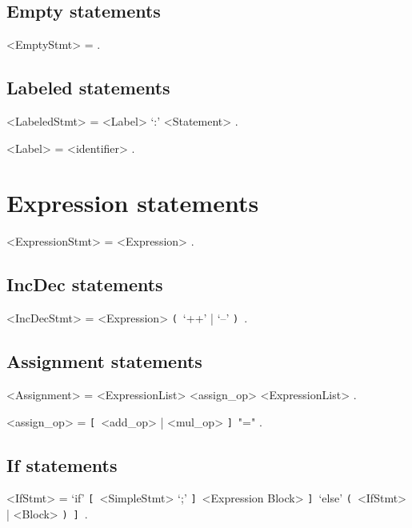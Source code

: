\documentclass{article}
\def\lopt{\synshortsoff\texttt{[}\synshorts~}
\def\ropt{\synshortsoff\texttt{]}\synshorts~}
\def\lgrp{\synshortsoff\texttt{(}\synshorts~}
\def\rgrp{\synshortsoff\texttt{)}\synshorts~}
\begin{document}
\subsection*{Empty statements}
\begin{grammar}
	<EmptyStmt> = .
\end{grammar} 

\subsection*{Labeled statements}
\begin{grammar}
	<LabeledStmt> = <Label> `:' <Statement> .

	<Label> = <identifier> .
\end{grammar}

\section*{Expression statements}
\begin{grammar}
	<ExpressionStmt> = <Expression> .
\end{grammar}

\subsection*{IncDec statements}
\begin{grammar}
	<IncDecStmt> = <Expression> \lgrp `++' | `--' \rgrp .
\end{grammar}

\subsection*{Assignment statements}
\begin{grammar}
	<Assignment> = <ExpressionList> <assign_op> <ExpressionList> .

	<assign_op> = \lopt <add_op> | <mul_op> \ropt "=" .
\end{grammar}

\subsection*{If statements}
\begin{grammar}
	<IfStmt> = `if' \lopt <SimpleStmt> `;' \ropt <Expression Block> \ropt `else' \lgrp <IfStmt> | <Block> \rgrp \ropt .
\end{grammar}
\end{document}

